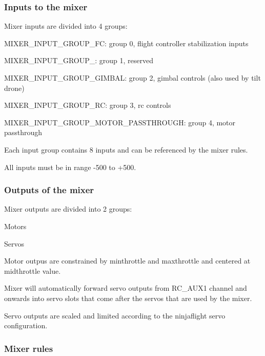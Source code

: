 \subsubsection*{Inputs to the mixer }

Mixer inputs are divided into 4 groups\+:
\begin{DoxyItemize}
\item M\+I\+X\+E\+R\+\_\+\+I\+N\+P\+U\+T\+\_\+\+G\+R\+O\+U\+P\+\_\+\+F\+C\+: group 0, flight controller stabilization inputs
\item M\+I\+X\+E\+R\+\_\+\+I\+N\+P\+U\+T\+\_\+\+G\+R\+O\+U\+P\+\_\+: group 1, reserved
\item M\+I\+X\+E\+R\+\_\+\+I\+N\+P\+U\+T\+\_\+\+G\+R\+O\+U\+P\+\_\+\+G\+I\+M\+B\+A\+L\+: group 2, gimbal controls (also used by tilt drone)
\item M\+I\+X\+E\+R\+\_\+\+I\+N\+P\+U\+T\+\_\+\+G\+R\+O\+U\+P\+\_\+\+R\+C\+: group 3, rc controls
\item M\+I\+X\+E\+R\+\_\+\+I\+N\+P\+U\+T\+\_\+\+G\+R\+O\+U\+P\+\_\+\+M\+O\+T\+O\+R\+\_\+\+P\+A\+S\+S\+T\+H\+R\+O\+U\+G\+H\+: group 4, motor passthrough
\end{DoxyItemize}

Each input group contains 8 inputs and can be referenced by the mixer rules.

All inputs must be in range -\/500 to +500.

\subsubsection*{Outputs of the mixer }

Mixer outputs are divided into 2 groups\+:
\begin{DoxyItemize}
\item Motors
\item Servos
\end{DoxyItemize}

Motor outpus are constrained by minthrottle and maxthrottle and centered at midthrottle value.

Mixer will automatically forward servo outputs from R\+C\+\_\+\+A\+U\+X1 channel and onwards into servo slots that come after the servos that are used by the mixer.

Servo outputs are scaled and limited according to the ninjaflight servo configuration.

\subsubsection*{Mixer rules }

